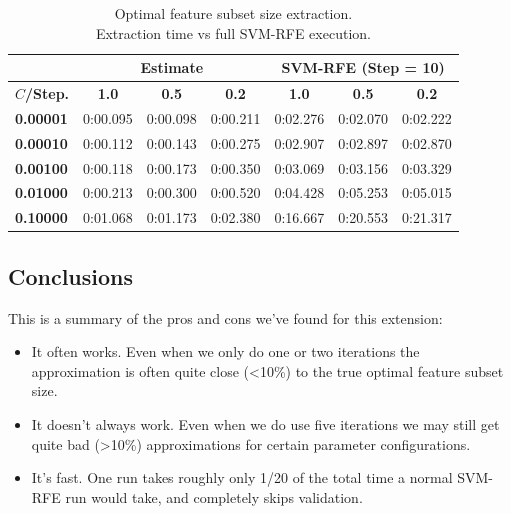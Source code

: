 \begin{table}[H]
    \centering
    \begin{tabular}{l | c c c | c c c}
        \toprule
         & \multicolumn{3}{c}{\textbf{Estimate}} & \multicolumn{3}{c}{\textbf{SVM-RFE (Step = 10)}} \\
        \midrule
        \textbf{$C$/Step.}&\textbf{1.0}&\textbf{0.5}&\textbf{0.2}&\textbf{1.0}&\textbf{0.5}&\textbf{0.2} \\
        \midrule
        \textbf{0.00001} & 0:00.095 & 0:00.098 & 0:00.211 &     0:02.276 & 0:02.070 & 0:02.222\\
        \textbf{0.00010} & 0:00.112 & 0:00.143 & 0:00.275 &     0:02.907 & 0:02.897 & 0:02.870\\
        \textbf{0.00100} & 0:00.118 & 0:00.173 & 0:00.350 &     0:03.069 & 0:03.156 & 0:03.329\\
        \textbf{0.01000} & 0:00.213 & 0:00.300 & 0:00.520 &     0:04.428 & 0:05.253 & 0:05.015\\
        \textbf{0.10000} & 0:01.068 & 0:01.173 & 0:02.380 &     0:16.667 & 0:20.553 & 0:21.317\\
        \bottomrule
        \end{tabular}
    \caption{Optimal feature subset size extraction.\\Extraction time vs full SVM-RFE execution.}
    \label{fig:ch5.stopcond.art.tabletime}
\end{table}

\subsection{Conclusions}

This is a summary of the pros and cons we've found for this extension:

\begin{itemize}
    \item It often works. Even when we only do one or two iterations the approximation is often quite close (<10\%) to the true optimal feature subset size.
    \item It doesn't always work. Even when we do use five iterations we may still get quite bad (>10\%) approximations for certain parameter configurations.
    \item It's fast. One run takes roughly only 1/20 of the total time a normal SVM-RFE run would take, and completely skips validation.
\end{itemize}

